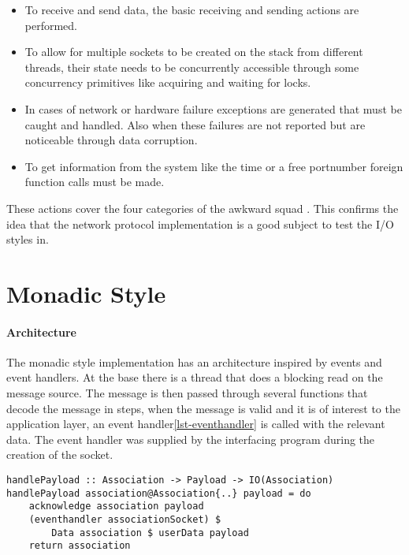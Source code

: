 \begin{itemize}

\item To receive and send data, the basic receiving and sending actions are performed.

\item To allow for multiple sockets to be created on the stack from different threads, their state needs to be concurrently accessible through some concurrency primitives like acquiring and waiting for locks.

\item In cases of network or hardware failure exceptions are generated that must be caught and handled. Also when these failures are not reported but are noticeable through data corruption.

\item To get information from the system like the time or a free portnumber foreign function calls must be made.
\end{itemize}

These actions cover the four categories of the awkward squad \cite{jones_tackling_2009}. 
This confirms the idea that the network protocol implementation is a good subject to test the I/O styles in.
\section{Monadic Style}
\paragraph{Architecture}
The monadic style implementation has an architecture inspired by events and event handlers. At the base there is a thread that does a blocking read on the message source. The message is then passed through several functions that decode the message in steps, when the message is valid and it is of interest to the application layer, an event handler\ref{lst-eventhandler} is called with the relevant data. The event handler was supplied by the interfacing program during the creation of the socket.

\begin{lstlisting}[caption={The eventhandler is called when a payload is received},label={lst-eventhandler}]
handlePayload :: Association -> Payload -> IO(Association)
handlePayload association@Association{..} payload = do 
    acknowledge association payload
    (eventhandler associationSocket) $
	    Data association $ userData payload
    return association
\end{lstlisting}


